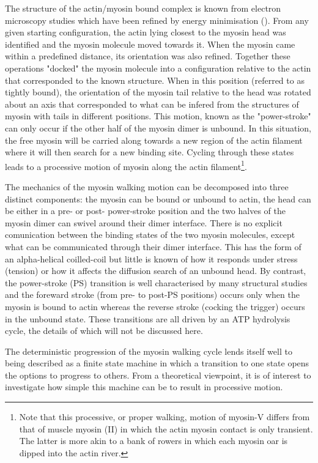 The structure of the actin/myosin bound complex is known from electron
microscopy studies which have been refined by energy minimisation ().
From any given starting configuration, the actin lying closest to the
myosin head was identified and the myosin molecule moved towards it.
When the myosin came within a predefined distance, its orientation was
also refined.   Together these operations "docked" the myosin molecule
into a configuration relative to the actin that corresponded to the
known structure.    When in this position (referred to as tightly bound),
the orientation of the myosin tail relative to the head was rotated
about an axis that corresponded to what can be infered from the structures
of myosin with tails in different positions.  This motion, known as 
the "power-stroke" can only occur if the other half of the myosin 
dimer is unbound.  In this situation, the free myosin will be carried 
along towards a new region of the actin filament where it will then search
for a new binding site.   Cycling through these states leads to a 
processive motion of myosin along the actin filament\footnote{
Note that this processive, or proper walking, motion of myosin-V differs
from that of muscle myosin (II) in which the actin myosin contact is
only transient.  The latter is more akin to a bank of rowers in which
each myosin oar is dipped into the actin river.}.

The mechanics of the myosin walking motion can be decomposed into three
distinct components:  the myosin can be bound or unbound to actin,
the head can be either in a pre- or post- power-stroke position and the
two halves of the myosin dimer can swivel around their dimer interface.
There is no explicit comunication between the binding states of the
two myosin molecules, except what can be communicated through their
dimer interface.   This has the form of an alpha-helical coilled-coil
but little is known of how it responds under stress (tension) or how
it affects the diffusion search of an unbound head.   By contrast, the 
power-stroke (PS) transition is well characterised by many structural 
studies and the foreward stroke (from pre- to post-PS positions) 
occurs only when the myosin is bound to actin whereas the reverse
stroke (cocking the trigger) occurs in the unbound state.   These
transitions are all driven by an ATP hydrolysis cycle, the details of
which will not be discussed here.

The deterministic progression of the myosin walking cycle lends itself
well to being described as a finite state machine in which a transition to
one state opens the options to progress to others.   From a theoretical
viewpoint, it is of interest to investigate how simple this machine can
be to result in processive motion.

